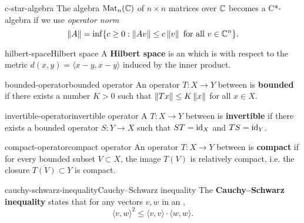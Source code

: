\begin{example}{c-star-algebra}
    The algebra $\text{Mat}_n(\mathbb{C})$ of $n \times n$ matrices over $\mathbb{C}$ becomes a C*-algebra if we use \textit{operator norm}
    \[ \left\|A\right\| = \inf \{ c \ge 0 : \left\|A v\right\| \le c \left\|v\right\| \text{ for all } v \in \mathbb{C}^n \} . \]
\end{example}

\begin{topic}{hilbert-space}{Hilbert space}
    A \textbf{Hilbert space} is an  which is  with respect to the metric $d(x, y) = \langle x - y, x - y \rangle$ induced by the inner product.
\end{topic}

\begin{topic}{bounded-operator}{bounded operator}
    An operator $T : X \to Y$ between   is \textbf{bounded} if there exists a number $K > 0$ such that $\left\|Tx\right\| \le K \left\|x\right\|$ for all $x \in X$.
\end{topic}

\begin{topic}{invertible-operator}{invertible operator}
    A  $T : X \to Y$ between   is \textbf{invertible} if there exists a bounded operator $S : Y \to X$ such that $ST = \text{id}_X$ and $TS = \text{id}_Y$.
\end{topic}

\begin{topic}{compact-operator}{compact operator}
    An operator $T : X \to Y$ between   is \textbf{compact} if for every bounded subset $V \subset X$, the image $T(V)$ is relatively compact, i.e. the closure $\overline{T(V)} \subset Y$ is compact.
\end{topic}

\begin{topic}{cauchy-schwarz-inequality}{Cauchy--Schwarz inequality}
    The \textbf{Cauchy--Schwarz inequality} states that for any vectors $v, w$ in an ,
    \[ \langle v, w \rangle^2 \le \langle v, v \rangle \cdot \langle w, w \rangle . \]
\end{topic}
